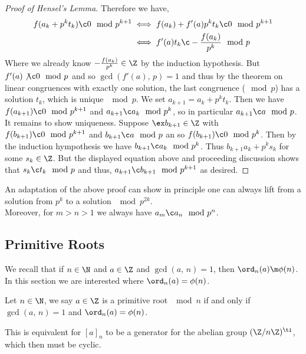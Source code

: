 \begin{proof}[Proof of Hensel's Lemma]
   Therefore we have,
   \begin{align*}
     f(a_k + p^kt_k) \c 0 \mod p^{k+1} &\iff f(a_k) + f'(a)p^kt_k \c 0 \mod p^{k+1}\\
     &\iff f'(a)t_k \c - \frac{f(a_k) }{p^k} \mod p
   \end{align*}
   Where we already know $-\frac{f(a_k)}{p^k} \in \Z$ by the induction hypothesis. But $f'(a) \not\c 0 \mod p$ and so $\gcd(f'(a),\,p) = 1$ and thus by the theorem on linear congruences with exactly one solution, the last congruence ($\mod p$) has a solution $t_k$, which is unique $\mod p$.    We set $a_{k+1} = a_k + p^kt_k$. Then we have $f(a_{k+1}) \c 0 \mod p^{k+1}$ and $a_{k+1} \c a_k \mod p^k$, so in particular $a_{k+1} \c a \mod p$. \\
   It remains to show uniqueness. Suppose $\ex b_{k+1} \in \Z$ with $f(b_{k+1}) \c 0 \mod p^{k+1}$ and $b_{k+1} \c a \mod p$ an so $f(b_{k+1}) \c 0 \mod p^k$. Then by the induction hympothesis we have $b_{k+1} \c a_k \mod p^k$. Thus $b_{k+1} a_k + p^ks_k$ for some $s_k \in \Z$. But the displayed equation above and proceeding discussion shows that $s_k \c t_k \mod p$ and thus, $a_{k+1} \c b_{k+1} \mod p^{k+1}$ as desired.
 \end{proof}

\begin{remark}
  An adaptation of the above proof can show in principle one can always lift from a solution from $p^k$ to a solution $\mod p^{2k}$.\\
  Moreover, for $m > n > 1$ we always have $a_m \c a_n \mod p^n$.
\end{remark}

\subsection{Primitive Roots}
We recall that if $n \in \N$ and $a \in \Z$ and $\gcd(a,\,n) = 1$, then $\ord_n(a) \m \phi(n)$. In this section we are interested where $\ord_n(a) = \phi(n)$.

\begin{ndefi}
  Let $n \in \N$, we say $a \in \Z$ is a primitive root $\mod n$ if and only if $\gcd(a,\,n) = 1$ and $\ord_n(a) = \phi(n)$.
\end{ndefi}

\begin{remark}
   This is equivalent for $[a]_n$ to be a generator for the abelian group $(\Z/n\Z)^\ti$, which then must be cyclic.
\end{remark}

